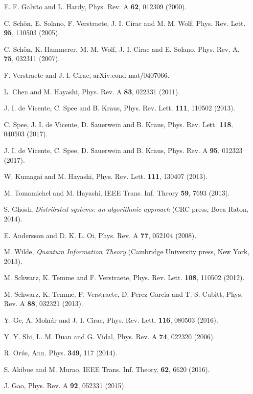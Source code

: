 \documentclass[preprintnumbers,aps,amsmath,amssymb,pra,twocolumn,showpacs,superscriptaddress,floatfix]{revtex4-1}
\theoremstyle{plain}
\theoremstyle{definition}
\theoremstyle{remark}
\begin{document}
\begin{thebibliography}{99}
 E. F. Galv{\~a}o and L. Hardy, Phys. Rev. A \textbf {62}, 012309 (2000).

 C. Sch{\"o}n, E. Solano, F. Verstraete, J. I. Cirac and M. M. Wolf, Phys. Rev. Lett. \textbf{95}, 110503 (2005).

C. Sch{\"o}n, K. Hammerer, M. M. Wolf, J. I. Cirac and E. Solano, Phys. Rev. A, \textbf{75}, 032311 (2007).

 F. Verstraete and J. I. Cirac, arXiv:cond-mat/0407066.

 L. Chen and M. Hayashi, Phys. Rev. A \textbf {83}, 022331 (2011).

 J. I. de Vicente, C. Spee and B. Kraus, Phys. Rev. Lett. \textbf{111}, 110502 (2013).

 C. Spee, J. I. de Vicente, D. Sauerwein and B. Kraus, Phys. Rev. Lett. \textbf{118}, 040503 (2017).

 J. I. de Vicente, C. Spee, D. Sauerwein and B. Kraus, Phys. Rev. A \textbf{95}, 012323 (2017).

 W. Kumagai and M. Hayashi, Phys. Rev. Lett. \textbf{111}, 130407 (2013).

 M. Tomamichel and M. Hayashi, IEEE Trans. Inf. Theory \textbf{59}, 7693 (2013).

 S. Ghosh,  \textit{Distributed systems: an algorithmic approach} (CRC press, Boca Raton, 2014).

 E. Andersson and D. K. L. Oi, Phys. Rev. A \textbf{77}, 052104 (2008).

 M. Wilde,  \textit{Quantum Information Theory} (Cambridge University press, New York, 2013).

 M. Schwarz, K. Temme and F. Verstraete, Phys. Rev. Lett. \textbf{108}, 110502 (2012).

 M. Schwarz, K. Temme, F. Verstraete, D. Perez-Garcia and T. S. Cubitt, Phys. Rev. A \textbf{88}, 032321 (2013).

 Y. Ge, A. Moln{\'a}r and J. I. Cirac, Phys. Rev. Lett. \textbf{116}, 080503 (2016).

 Y. Y. Shi, L. M. Duan and G. Vidal, Phys. Rev. A \textbf{74}, 022320 (2006).

 R. Or{\'u}s, Ann. Phys. \textbf{349}, 117 (2014).

 S. Akibue and M. Murao, IEEE Trans. Inf. Theory, \textbf{62}, 6620 (2016).

 J. Gao, Phys. Rev. A \textbf{92}, 052331 (2015).

\end{thebibliography}
\end{document}
